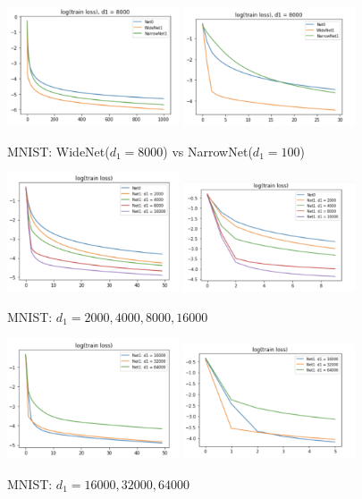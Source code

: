 \begin{figure}[H]
	\centering
	\includegraphics[width=2in]{figure/MNIST_hidden8000_step1000.png}
	\includegraphics[width=2in]{figure/MNIST_hidden8000_step30.png}
	\caption{MNIST: WideNet($d_1 = 8000$) vs NarrowNet($d_1 = 100$)}
\end{figure}

\begin{figure}[H]
	\centering
	\includegraphics[width=2in]{figure/MNIST_hidden64000_1.png}
	\includegraphics[width=2in]{figure/MNIST_hidden64000_2.png}
	\caption{MNIST: $d_1 = 2000,4000,8000,16000$}
\end{figure}

\begin{figure}[H]
	\centering
	\includegraphics[width=2in]{figure/MNIST_hidden64000_3.png}
	\includegraphics[width=2in]{figure/MNIST_hidden64000_4.png}
	\caption{MNIST: $d_1 = 16000, 32000, 64000$}
\end{figure}

